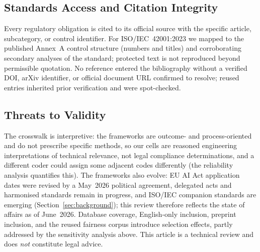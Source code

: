 \subsection{Standards Access and Citation Integrity}
Every regulatory obligation is cited to its official source with the specific article,
subcategory, or control identifier. For ISO/IEC~42001:2023 we mapped to the published
Annex~A control structure (numbers and titles) and corroborating secondary analyses of the
standard; protected text is not reproduced beyond permissible quotation. No reference
entered the bibliography without a verified DOI, arXiv identifier, or official document URL
confirmed to resolve; reused entries inherited prior verification and were spot-checked.

\subsection{Threats to Validity}
The crosswalk is interpretive: the frameworks are outcome- and process-oriented and do not
prescribe specific methods, so our cells are reasoned engineering interpretations of
technical relevance, not legal compliance determinations, and a different coder could
assign some adjacent codes differently (the reliability analysis quantifies this). The
frameworks also evolve: EU AI Act application dates were revised by a May~2026 political
agreement, delegated acts and harmonised standards remain in progress, and ISO/IEC
companion standards are emerging (Section~\ref{sec:background}); this review therefore
reflects the state of affairs as of June~2026. Database coverage, English-only inclusion,
preprint inclusion, and the reused fairness corpus introduce selection effects, partly
addressed by the sensitivity analysis above. This article is a technical review and does
\emph{not} constitute legal advice.
